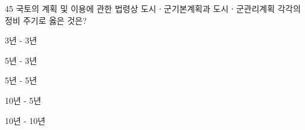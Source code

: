 \begin{question}{45}
국토의 계획 및 이용에 관한 법령상 도시ㆍ군기본계획과 도시ㆍ군관리계획 각각의 정비 주기로 옳은 것은?
\begin{choices}
  \item 3년 - 3년
  \item 5년 - 3년
  \item 5년 - 5년
  \item 10년 - 5년
  \item 10년 - 10년
\end{choices}
\end{question}
